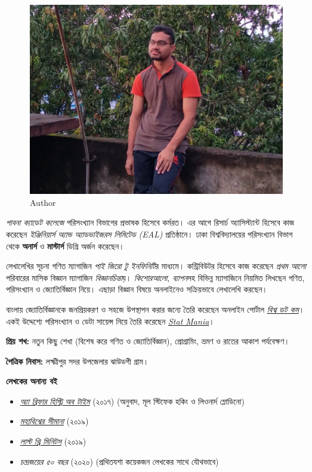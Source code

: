 \documentclass[
]{book}
\providecommand{\tightlist}{%
  \setlength{\itemsep}{0pt}\setlength{\parskip}{0pt}}
\begin{document}
\begin{figure}

{\centering \includegraphics[width=0.5\linewidth]{mahmud} 

}

\caption{Author}\label{fig:author}
\end{figure}

\emph{পাবনা ক্যাডেট কলেজে} পরিসংখ্যান বিভাগের প্রভাষক হিসেবে কর্মরত। এর আগে রিসার্চ অ্যাসিস্ট্যান্ট হিসেবে কাজ করেছেন \emph{ইঞ্জিনিয়ার্স অ্যান্ড অ্যাডভাইজরস লিমিটেড (EAL)} প্রতিষ্ঠানে। ঢাকা বিশ্ববিদ্যালয়ের পরিসংখ্যান বিভাগ থেকে \textbf{অনার্স} ও \textbf{মাস্টার্স} ডিগ্রি অর্জন করেছেন।

লেখালেখির সূচনা গণিত ম্যাগাজিন \emph{পাই জিরো টু ইনফিনিটি}র মাধ্যমে। কন্ট্রিবিউটর হিসেবে কাজ করেছেন \emph{প্রথম আলো} পরিবারের মাসিক বিজ্ঞান ম্যাগাজিন \emph{বিজ্ঞানচিন্তা}য়। \emph{কিশোরআলো}, \emph{ব্যাপন}সহ বিভিন্ন ম্যাগাজিনে নিয়মিত লিখছেন গণিত, পরিসংখ্যান ও জ্যোতির্বিজ্ঞান নিয়ে। এছাড়া বিজ্ঞান বিষয়ে অনলাইনেও সক্রিয়ভাবে লেখালেখি করছেন।

বাংলায় জ্যোতির্বিজ্ঞানকে জনপ্রিয়করণ ও সহজে উপস্থাপন করার জন্যে তৈরি করেছেন অনলাইন পোর্টাল \href{https://sky.bishwo.com}{\emph{বিশ্ব ডট কম}}। একই উদ্দেশ্যে পরিসংখ্যান ও ডেটা সায়েন্স নিয়ে তৈরি করেছেন \href{https://www.statmania.info}{\emph{Stat Mania}}।

\textbf{প্রিয় শখ:} নতুন কিছু শেখা (বিশেষ করে গণিত ও জ্যোতির্বিজ্ঞান), প্রোগ্রামিং, ভ্রমণ ও রাতের আকাশ পর্যবেক্ষণ।

\textbf{পৈত্রিক নিবাস:} লক্ষ্মীপুর সদর উপজেলার ঝাউডগী গ্রাম।

\textbf{লেখকের অনান্য বই}

\begin{itemize}
\tightlist
\item
  \emph{\href{https://www.rokomari.com/book/author/47631}{অ্যা ব্রিফার হিস্ট্রি অব টাইম}} (২০১৭) (অনুবাদ, মূল স্টিফেক হকিং ও লিওনার্দ ম্লোডিনো)
\item
  \emph{\href{https://www.rokomari.com/book/author/47631}{মহাবিশ্বের সীমানা}} (২০১৯)
\item
  \emph{\href{https://www.rokomari.com/book/author/47631}{লাস্ট থ্রি মিনিটস}} (২০১৯)
\item
  \emph{চন্দ্রজয়ের ৫০ বছর} (২০২০) (প্রথিতযশা কয়েকজন লেখকের সাথে যৌথভাবে)
\end{itemize}
\end{document}

